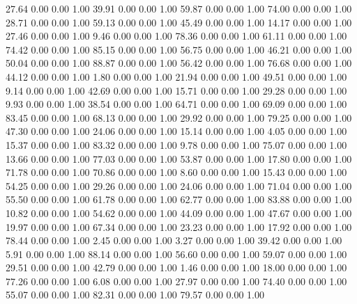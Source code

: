    27.64   0.00   0.00   1.00
   39.91   0.00   0.00   1.00
   59.87   0.00   0.00   1.00
   74.00   0.00   0.00   1.00
   28.71   0.00   0.00   1.00
   59.13   0.00   0.00   1.00
   45.49   0.00   0.00   1.00
   14.17   0.00   0.00   1.00
   27.46   0.00   0.00   1.00
    9.46   0.00   0.00   1.00
   78.36   0.00   0.00   1.00
   61.11   0.00   0.00   1.00
   74.42   0.00   0.00   1.00
   85.15   0.00   0.00   1.00
   56.75   0.00   0.00   1.00
   46.21   0.00   0.00   1.00
   50.04   0.00   0.00   1.00
   88.87   0.00   0.00   1.00
   56.42   0.00   0.00   1.00
   76.68   0.00   0.00   1.00
   44.12   0.00   0.00   1.00
    1.80   0.00   0.00   1.00
   21.94   0.00   0.00   1.00
   49.51   0.00   0.00   1.00
    9.14   0.00   0.00   1.00
   42.69   0.00   0.00   1.00
   15.71   0.00   0.00   1.00
   29.28   0.00   0.00   1.00
    9.93   0.00   0.00   1.00
   38.54   0.00   0.00   1.00
   64.71   0.00   0.00   1.00
   69.09   0.00   0.00   1.00
   83.45   0.00   0.00   1.00
   68.13   0.00   0.00   1.00
   29.92   0.00   0.00   1.00
   79.25   0.00   0.00   1.00
   47.30   0.00   0.00   1.00
   24.06   0.00   0.00   1.00
   15.14   0.00   0.00   1.00
    4.05   0.00   0.00   1.00
   15.37   0.00   0.00   1.00
   83.32   0.00   0.00   1.00
    9.78   0.00   0.00   1.00
   75.07   0.00   0.00   1.00
   13.66   0.00   0.00   1.00
   77.03   0.00   0.00   1.00
   53.87   0.00   0.00   1.00
   17.80   0.00   0.00   1.00
   71.78   0.00   0.00   1.00
   70.86   0.00   0.00   1.00
    8.60   0.00   0.00   1.00
   15.43   0.00   0.00   1.00
   54.25   0.00   0.00   1.00
   29.26   0.00   0.00   1.00
   24.06   0.00   0.00   1.00
   71.04   0.00   0.00   1.00
   55.50   0.00   0.00   1.00
   61.78   0.00   0.00   1.00
   62.77   0.00   0.00   1.00
   83.88   0.00   0.00   1.00
   10.82   0.00   0.00   1.00
   54.62   0.00   0.00   1.00
   44.09   0.00   0.00   1.00
   47.67   0.00   0.00   1.00
   19.97   0.00   0.00   1.00
   67.34   0.00   0.00   1.00
   23.23   0.00   0.00   1.00
   17.92   0.00   0.00   1.00
   78.44   0.00   0.00   1.00
    2.45   0.00   0.00   1.00
    3.27   0.00   0.00   1.00
   39.42   0.00   0.00   1.00
    5.91   0.00   0.00   1.00
   88.14   0.00   0.00   1.00
   56.60   0.00   0.00   1.00
   59.07   0.00   0.00   1.00
   29.51   0.00   0.00   1.00
   42.79   0.00   0.00   1.00
    1.46   0.00   0.00   1.00
   18.00   0.00   0.00   1.00
   77.26   0.00   0.00   1.00
    6.08   0.00   0.00   1.00
   27.97   0.00   0.00   1.00
   74.40   0.00   0.00   1.00
   55.07   0.00   0.00   1.00
   82.31   0.00   0.00   1.00
   79.57   0.00   0.00   1.00

